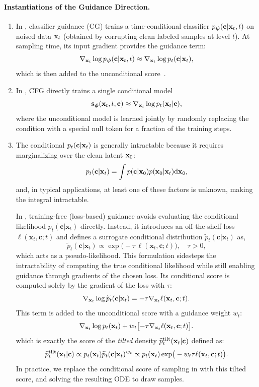 \paragraph{Instantiations of the Guidance Direction.}
\begin{enumerate}[leftmargin=*]
\item {} In , classifier guidance (CG) trains a time-conditional classifier
$p_{{\bm{\psi}}}({\mathbf{c}} | {\mathbf{x}}_t, t)$ on noised data ${\mathbf{x}}_t$ (obtained by corrupting
clean labeled samples at level $t$). At sampling time, its input gradient
provides the guidance term:
\[
\nabla_{{\mathbf{x}}_t}\log p_{{\bm{\psi}}}({\mathbf{c}} | {\mathbf{x}}_t, t)
 \approx  \nabla_{{\mathbf{x}}_t}\log p_t({\mathbf{c}} | {\mathbf{x}}_t),
\]
which is then added to the unconditional score~\citep{dhariwal2021diffusion}.
\item {} In , CFG directly trains a single conditional model
\[
{\mathbf{s}}_{{\bm{\phi}}}({\mathbf{x}}_t,t,{\mathbf{c}}) \approx \nabla_{{\mathbf{x}}_t}\log p_t({\mathbf{x}}_t|{\mathbf{c}}),
\]
where the unconditional model is learned jointly by randomly replacing the condition with a special null token for a fraction of the training steps.
\item {}  The conditional $p_t({\mathbf{c}}| {\mathbf{x}}_t)$ is generally intractable because it
requires marginalizing over the clean latent ${\mathbf{x}}_0$:
\[
p_t({\mathbf{c}}| {\mathbf{x}}_t)
= \int p({\mathbf{c}}| {\mathbf{x}}_0)  p({\mathbf{x}}_0| {\mathbf{x}}_t)  \mathrm d{\mathbf{x}}_0,
\]
and, in typical applications, at least one of these factors is unknown, making the integral intractable.

In , training-free (loss-based) guidance avoids evaluating the 
conditional likelihood $p_t(\mathbf{c}| \mathbf{x}_t)$ directly. 
Instead, it introduces an off-the-shelf loss $\ell(\mathbf{x}_t,\mathbf{c};t)$ 
and defines a surrogate conditional distribution $\widetilde p_t(\mathbf{c}|\mathbf{x}_t) $ as,
\[
\widetilde p_t(\mathbf{c}|\mathbf{x}_t) \propto \exp\!\big(-\tau\,\ell(\mathbf{x}_t,\mathbf{c};t)\big),
\quad \tau>0,
\]
which acts as a pseudo-likelihood. 
This formulation sidesteps the intractability of computing the true conditional 
likelihood while still enabling guidance through gradients of the chosen loss. Its conditional score is computed solely by the gradient of the loss with $\tau$:
\[
\nabla_{{\mathbf{x}}_t}\log \widetilde p_t({\mathbf{c}}|{\mathbf{x}}_t)
= -\tau \nabla_{{\mathbf{x}}_t}\ell({\mathbf{x}}_t,{\mathbf{c}}; t).
\] 
This term is added to the unconditional score with a guidance weight $w_t$:
\[
 \nabla_{{\mathbf{x}}_t}\log p_t({\mathbf{x}}_t)
+ w_t \bigl[-\tau \nabla_{{\mathbf{x}}_t}\ell({\mathbf{x}}_t,{\mathbf{c}}; t)\bigr].
\]
which is exactly the score of the \emph{tilted} density $\widetilde p_t^{\mathrm{tilt}}({\mathbf{x}}_t| {\mathbf{c}})$ defined as:
\[
\widetilde p_t^{\mathrm{tilt}}({\mathbf{x}}_t| {\mathbf{c}}) \propto  p_t({\mathbf{x}}_t) \widetilde p_t({\mathbf{c}}| {\mathbf{x}}_t)^{w_t}
 \propto  p_t({\mathbf{x}}_t) \exp\!\big(-w_t\tau \ell({\mathbf{x}}_t,{\mathbf{c}}; t)\big).
\]
In practice, we replace the conditional score of sampling in  with this tilted score, and solving the resulting ODE to  draw samples.


\end{enumerate}
